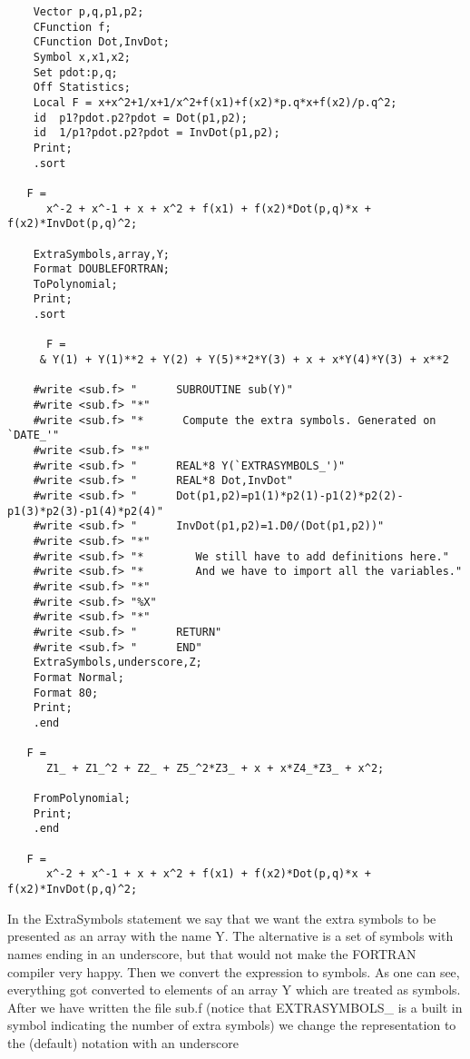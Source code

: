 \begin{verbatim}
    Vector p,q,p1,p2;
    CFunction f;
    CFunction Dot,InvDot;
    Symbol x,x1,x2;
    Set pdot:p,q;
    Off Statistics;
    Local F = x+x^2+1/x+1/x^2+f(x1)+f(x2)*p.q*x+f(x2)/p.q^2;
    id  p1?pdot.p2?pdot = Dot(p1,p2);
    id  1/p1?pdot.p2?pdot = InvDot(p1,p2);
    Print;
    .sort

   F =
      x^-2 + x^-1 + x + x^2 + f(x1) + f(x2)*Dot(p,q)*x + f(x2)*InvDot(p,q)^2;

    ExtraSymbols,array,Y;
    Format DOUBLEFORTRAN;
    ToPolynomial;
    Print;
    .sort

      F =
     & Y(1) + Y(1)**2 + Y(2) + Y(5)**2*Y(3) + x + x*Y(4)*Y(3) + x**2

    #write <sub.f> "      SUBROUTINE sub(Y)"
    #write <sub.f> "*"
    #write <sub.f> "*      Compute the extra symbols. Generated on `DATE_'"
    #write <sub.f> "*"
    #write <sub.f> "      REAL*8 Y(`EXTRASYMBOLS_')"
    #write <sub.f> "      REAL*8 Dot,InvDot"
    #write <sub.f> "      Dot(p1,p2)=p1(1)*p2(1)-p1(2)*p2(2)-p1(3)*p2(3)-p1(4)*p2(4)"
    #write <sub.f> "      InvDot(p1,p2)=1.D0/(Dot(p1,p2))"
    #write <sub.f> "*"
    #write <sub.f> "*        We still have to add definitions here."
    #write <sub.f> "*        And we have to import all the variables."
    #write <sub.f> "*"
    #write <sub.f> "%X"
    #write <sub.f> "*"
    #write <sub.f> "      RETURN"
    #write <sub.f> "      END"
    ExtraSymbols,underscore,Z;
    Format Normal;
    Format 80;
    Print;
    .end

   F =
      Z1_ + Z1_^2 + Z2_ + Z5_^2*Z3_ + x + x*Z4_*Z3_ + x^2;

    FromPolynomial;
    Print;
    .end

   F =
      x^-2 + x^-1 + x + x^2 + f(x1) + f(x2)*Dot(p,q)*x + f(x2)*InvDot(p,q)^2;

\end{verbatim}
In the ExtraSymbols statement we say that we want the extra symbols to be 
presented as an array with the name Y. The alternative is a set of symbols 
with names ending in an underscore, but that would not make the FORTRAN 
compiler very happy. Then we convert the expression to symbols. As one can 
see, everything got converted to elements of an array Y which are treated 
as symbols. After we have written the file sub.f (notice that 
EXTRASYMBOLS\_ is a built in symbol indicating the number of extra symbols) 
we change the representation to the (default) notation with an underscore 
